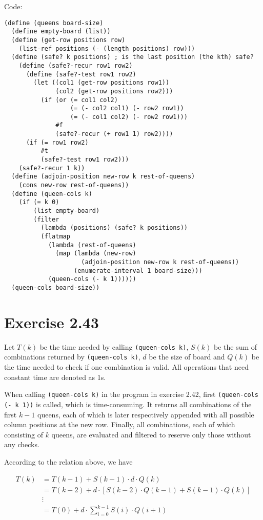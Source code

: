 \documentclass[../main.tex]{subfiles}
\begin{document}
Code:

\begin{lstlisting}
(define (queens board-size)
  (define empty-board (list))
  (define (get-row positions row)
    (list-ref positions (- (length positions) row)))
  (define (safe? k positions) ; is the last position (the kth) safe?
    (define (safe?-recur row1 row2)
      (define (safe?-test row1 row2)
        (let ((col1 (get-row positions row1))
              (col2 (get-row positions row2)))
          (if (or (= col1 col2)
                  (= (- col2 col1) (- row2 row1))
                  (= (- col1 col2) (- row2 row1)))
              #f
              (safe?-recur (+ row1 1) row2))))
      (if (= row1 row2)
          #t
          (safe?-test row1 row2)))
    (safe?-recur 1 k))
  (define (adjoin-position new-row k rest-of-queens)
    (cons new-row rest-of-queens))
  (define (queen-cols k)
    (if (= k 0)
        (list empty-board)
        (filter
          (lambda (positions) (safe? k positions))
          (flatmap
            (lambda (rest-of-queens)
              (map (lambda (new-row)
                     (adjoin-position new-row k rest-of-queens))
                   (enumerate-interval 1 board-size)))
            (queen-cols (- k 1))))))
  (queen-cols board-size))
\end{lstlisting}

\section{Exercise 2.43}

Let $T(k)$ be the time needed by calling \lstinline{(queen-cols k)},
 $S(k)$ be the sum of combinations returned by
 \lstinline{(queen-cols k)}, $d$ be the size of board and
 $Q(k)$ be the time needed to check if one combination
 is valid. All operations that need constant time
 are denoted as 1s.

When calling \lstinline{(queen-cols k)} in the
 program in exercise 2.42, first \lstinline{(queen-cols (- k 1))}
 is called, which is time-consuming.
 It returns all combinations of the first $k-1$
 queens, each of which is later respectively appended
 with all possible column positions at the new row.
 Finally, all combinations, each of which consisting
 of $k$ queens, are evaluated and filtered to reserve
 only those without any checks.

According to the relation above, we have

\begin{align*}
T(k) &= T(k-1) + S(k-1) \cdot d \cdot Q(k) \\
&= T(k-2) + d \cdot \left[S(k-2) \cdot Q(k-1) + S(k-1) \cdot Q(k)\right] \\
&\vdots \\
&= T(0) + d \cdot \sum_{i=0}^{k-1} S(i) \cdot Q(i+1)
\end{align*}
\end{document}
